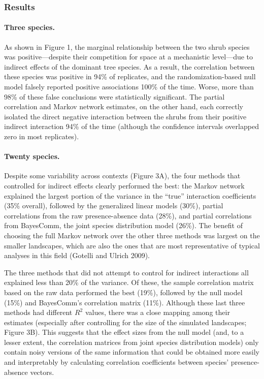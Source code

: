 \documentclass[12pt,]{article}
\begin{document}
\begin{spacing}{1.9}
\begin{flushleft}
\subsubsection{Results}\label{results}

\paragraph{Three species.}\label{three-species.}

As shown in Figure 1, the marginal relationship between the two shrub
species was positive---despite their competition for space at a
mechanistic level---due to indirect effects of the dominant tree
species. As a result, the correlation between these species was positive
in 94\% of replicates, and the randomization-based null model falsely
reported positive associations 100\% of the time. Worse, more than 98\%
of these false conclusions were statistically significant. The partial
correlation and Markov network estimates, on the other hand, each
correctly isolated the direct negative interaction between the shrubs
from their positive indirect interaction 94\% of the time (although the
confidence intervals overlapped zero in most replicates).

\paragraph{Twenty species.}\label{twenty-species.}

Despite some variability across contexts (Figure 3A), the four methods
that controlled for indirect effects clearly performed the best: the
Markov network explained the largest portion of the variance in the
``true'' interaction coefficients (35\% overall), followed by the
generalized linear models (30\%), partial correlations from the raw
presence-absence data (28\%), and partial correlations from BayesComm,
the joint species distribution model (26\%). The benefit of choosing the
full Markov network over the other three methods was largest on the
smaller landscapes, which are also the ones that are most representative
of typical analyses in this field (Gotelli and Ulrich 2009).

The three methods that did not attempt to control for indirect
interactions all explained less than 20\% of the variance. Of these, the
sample correlation matrix based on the raw data performed the best
(19\%), followed by the null model (15\%) and BayesComm's correlation
matrix (11\%). Although these last three methods had different \(R^2\)
values, there was a close mapping among their estimates (especially
after controlling for the size of the simulated landscapes; Figure 3B).
This suggests that the effect sizes from the null model (and, to a
lesser extent, the correlation matrices from joint species distribution
models) only contain noisy versions of the same information that could
be obtained more easily and interpretably by calculating correlation
coefficients between species' presence-absence vectors.


\end{flushleft}
\end{spacing}
\end{document}
